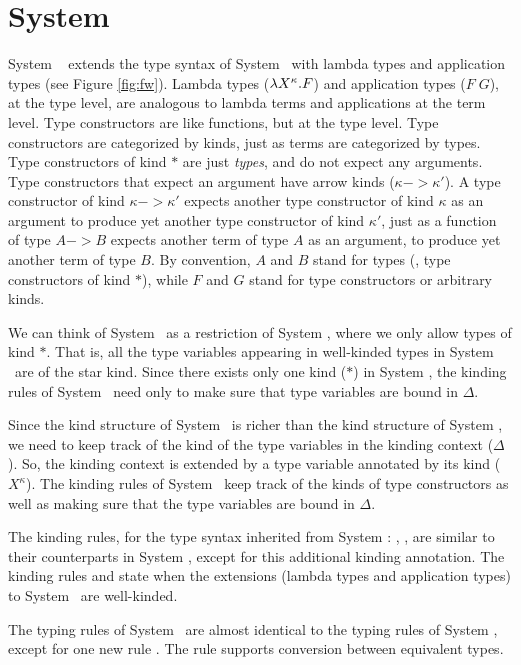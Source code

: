 \section{System \Fw} \label{sec:fw}
System \Fw\ \cite{Gir72} extends the type syntax of System \F\ with lambda types
and application types (see Figure \ref{fig:fw}). Lambda types ($\lambda X^\kappa.F$)
and application types ($F\;G$), at the type level, are analogous to lambda terms
and applications at the term level. Type constructors are like functions, but
at the type level. Type constructors are categorized by kinds, just as terms
are categorized by types. Type constructors of kind $*$ are just \emph{types},
and do not expect any arguments. Type constructors that expect an argument
have arrow kinds ($\kappa -> \kappa'$). A type constructor of kind
$\kappa -> \kappa'$ expects another type constructor of kind $\kappa$
as an argument to produce yet another type constructor of kind $\kappa'$,
just as a function of type $A -> B$ expects another term of type $A$
as an argument, to produce yet another term of type $B$. By convention,
$A$ and $B$ stand for types (\ie, type constructors of kind $*$),
while $F$ and $G$ stand for type constructors or arbitrary kinds.

We can think of System \F\ as a restriction of System \Fw, where we only
allow types of kind $*$. That is, all the type variables appearing in
well-kinded types in System \F\ are of the star kind. Since there exists only
one kind ($*$) in System \F, the kinding rules of System \F\ need only to make
sure that type variables are bound in $\Delta$.

Since the kind structure of System \Fw\ is richer than the kind structure of
System \F, we need to keep track of the kind of the type variables in
the kinding context ($\Delta$). So, the kinding context is extended by
a type variable annotated by its kind ($X^\kappa$). The kinding rules of
System \Fw\ keep track of the kinds of type constructors as well as making
sure that the type variables are bound in $\Delta$.

The kinding rules, for the type syntax inherited from System \F:
, ,  are similar to
their counterparts in System \F, except for this additional kinding annotation.
The kinding rules  and  state when the extensions
(lambda types and application types) to System \F\ are well-kinded.

The typing rules of System \Fw\ are almost identical to the typing rules of
System \F, except for one new rule . The  rule
supports conversion between equivalent types.

